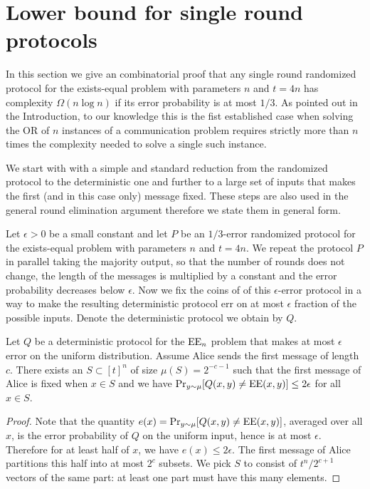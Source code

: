 \section{Lower bound for single round protocols}
\label{sec:elementary}
In this section we give an combinatorial proof that any single
round randomized protocol for the exists-equal problem with
parameters $n$ and $t=4n$ has complexity $\Omega(n\log n)$ if
its error probability is at most $1/3$. As pointed out in the
Introduction, to our knowledge this is the fist established case
when solving the OR of $n$ instances of a communication problem
requires strictly more than $n$ times the complexity needed to
solve a single such instance.

We start with with a simple and standard reduction from the
randomized protocol to the deterministic one and further to a
large set of inputs that makes the first (and in this case only)
message fixed. These steps are also used in the general round
elimination argument therefore we state them in general form.

Let $\epsilon>0$ be a small constant and let $P$ be an
$1/3$-error randomized protocol for the exists-equal problem
with parameters $n$ and $t=4n$. We repeat the protocol $P$ in
parallel taking the majority output, so that the number of
rounds does not change, the length of the messages is multiplied
by a constant and the error probability decreases below
$\epsilon$. Now we fix the coins of of this $\epsilon$-error
protocol in a way to make the resulting deterministic protocol
err on at most $\epsilon$ fraction of the possible inputs.
Denote the deterministic protocol we obtain by $Q$.

\begin{lemma}
\label{lem:determine-s}
Let $Q$ be a deterministic protocol for the $\operatorname{EE}_n$ problem that
makes at most $\epsilon$ error on the uniform distribution.
Assume Alice sends the first message of length $c$. There exists
an $S\subset [t]^n$ of size $\mu(S)=2^{-c-1}$ such that the
first message of Alice is fixed when $x\in S$ and we have
$\Pr_{y\sim \mu}[Q(x,y)\neq\operatorname{EE}(x,y)]\leq 2\epsilon$ for all
$x\in S$.
\end{lemma}

\begin{proof}
Note that the quantity $e(x)=\Pr_{y\sim
\mu}[Q(x,y)\neq\operatorname{EE}(x,y)]$, averaged over all $x$, is the error
probability of $Q$ on the uniform input, hence is at most
$\epsilon$. Therefore for at least half of $x$, we have
$e(x)\leq 2\epsilon$. The first message of Alice partitions this
half into at most $2^c$ subsets. We pick $S$ to consist of
$t^n/2^{c+1}$ vectors of the same part: at least one part must
have this many elements.
\end{proof}


